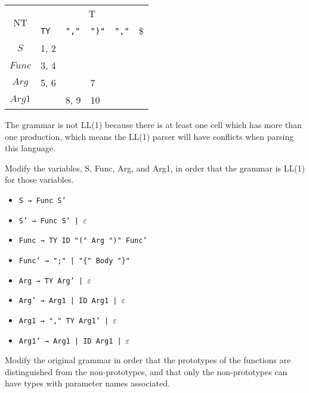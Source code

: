 \documentclass[docid=2021]{comp_exam_round1}
\begin{document}
\begin{center}
    \small
    \begin{tabular}{@{} c | p{25mm} | p{25mm} | p{25mm} | p{25mm} | p{25mm} @{}}
        \multirow{2}{*}{NT} & \multicolumn{5}{c}{T} \\ \cline{2-6}
               & \texttt{TY} & \texttt{","} & \texttt{")"} & \texttt{","} & \$ \\ \hline
        $S$    & 1, 2        &              &              &              &    \\ \hline
        $Func$ & 3, 4        &              &              &              &    \\ \hline
        $Arg$  & 5, 6        &              & 7            &              &    \\ \hline
        $Arg1$ &             & 8, 9         & 10           &              &   
    \end{tabular}
\end{center}

The grammar is not LL(1) because there is at least one cell which has more than one production, which means the LL(1) parser will have conflicts when parsing this language.

\question
Modify the variables, S, Func, Arg, and Arg1, in order that the grammar is LL(1) for those variables.

\ansseparator

\begin{itemize}[wide, noitemsep]
    \item \texttt{S → Func S'}
    \item \texttt{S' → Func S' | $\varepsilon$}
    \item \texttt{Func → TY ID "(" Arg ")" Func'}
    \item \texttt{Func' → ";" | "\{" Body "\}"}
    \item \texttt{Arg → TY Arg' | $\varepsilon$}
    \item \texttt{Arg' → Arg1 | ID Arg1 | $\varepsilon$}
    \item \texttt{Arg1 → "," TY Arg1' | $\varepsilon$}
    \item \texttt{Arg1' → Arg1 | ID Arg1 | $\varepsilon$}
\end{itemize}

\question
Modify the original grammar in order that the prototypes of the functions are distinguished from the non-prototypes, and that only the non-prototypes can have types with parameter names associated.

\ansseparator
\end{document}
